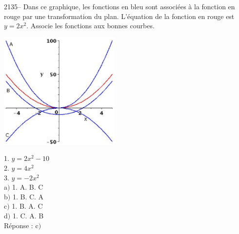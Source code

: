 \documentclass[letterpaper, 12pt]{article}
\begin{document}
2135-- Dans ce graphique, les fonctions en bleu sont associ\'ees \`a la fonction en rouge par une transformation du plan. L'\'equation de la fonction en rouge est $y=2x^{2}$. Associe les fonctions aux bonnes courbes.
\begin{center}
 \includegraphics[width=6cm,bb=14 14 415 415]{Q2135.eps}
\end{center}
1. $y=2x^{2}-10$\\
2. $y=4x^{2}$\\
3. $y=-2x^{2}$\\

a$)$ 1. A. B. C \\
b$)$ 1. B. C. A \\
c$)$ 1. B. A. C \\
d$)$ 1. C. A. B \\

R\'eponse : c$)$\\
\end{document}
